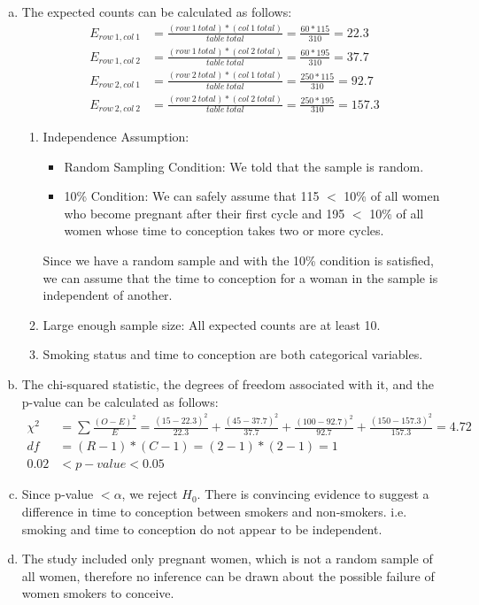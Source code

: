 {{{\begin{enumerate}[(a)]
$H_A$: There is some difference in time to conception between smokers and non-smokers.
\item The expected counts can be calculated as follows:
\begin{align*}
E_{row~1, col~1} &= \frac{(row~1~total)*(col~1~total)}{table~total} = \frac{60 * 115}{310} = 22.3 \\
E_{row~1, col~2} &= \frac{(row~1~total)*(col~2~total)}{table~total} = \frac{60 * 195}{310} = 37.7 \\
E_{row~2, col~1} &= \frac{(row~2~total)*(col~1~total)}{table~total} = \frac{250 * 115}{310} = 92.7 \\
E_{row~2, col~2} &= \frac{(row~2~total)*(col~2~total)}{table~total} = \frac{250 * 195}{310} = 157.3
\end{align*}
\begin{enumerate}[1.]
\item Independence Assumption: 
\begin{itemize}
\item Random Sampling Condition: We told that the sample is random.
\item 10\% Condition: We can safely assume that 115 $<$ 10\% of all women who become pregnant after their first cycle and 195 $<$ 10\% of all women whose time to conception takes two or more cycles.
\end{itemize}
Since we have a random sample and with the 10\% condition is satisfied, we can assume that the time to conception for a woman in the sample is independent of another.
\item Large enough sample size: All expected counts are at least 10.
\item Smoking status and time to conception are both categorical variables.
\end{enumerate}
\item The chi-squared statistic, the degrees of freedom associated with it, and the p-value can be calculated as follows:
\begin{align*}
\chi^2 &= \sum \frac{(O - E)^2}{E} =  \frac{(15 - 22.3)^2} {22.3} + \frac{(45 - 37.7)^2} {37.7} + \frac{(100 - 92.7)^2} {92.7} + \frac{(150 - 157.3)^2} {157.3} = 4.72 \\
df &= (R - 1) * (C - 1) = (2 - 1) * (2 - 1) = 1 \\
0.02 &< p-value < 0.05
\end{align*}
\item Since p-value $< \alpha$, we reject $H_0$. There is convincing evidence to suggest a difference in time to conception between smokers and non-smokers. i.e. smoking and time to conception do not appear to be independent.
\item The study included only pregnant women, which is not a random sample of all women, therefore no inference can be drawn about the possible failure of women smokers to conceive.
\end{enumerate}
}
}}

